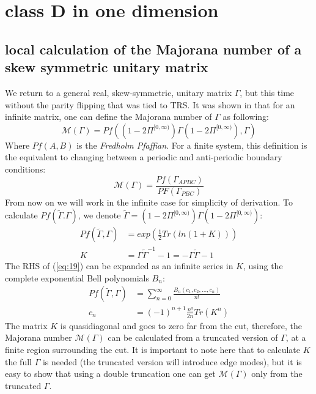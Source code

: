 \documentclass[%
 reprint,
 amsmath,amssymb,
 aps,
]{revtex4-2}
\begin{document}
\section{class D in one dimension}
\subsection{local calculation of the Majorana number of a skew symmetric unitary matrix}
We return to a general real, skew-symmetric, unitary matrix $\Gamma$, but this time without the parity flipping that was tied to TRS.
It was shown in \cite{kitaev2006} that for an infinite matrix, one can define the Majorana number of $\Gamma$ as following:
\begin{equation}
    \mathcal{M}(\Gamma)=Pf((1-2\Pi^{[0,\infty)})\Gamma(1-2\Pi^{[0,\infty)}),\Gamma)
\end{equation}
Where $Pf(A,B)$ is the \textit{Fredholm Pfaffian}. For a finite system, this definition is the equivalent to changing between a periodic and anti-periodic boundary conditions:
\begin{equation}
    \mathcal{M}(\Gamma)=\frac{Pf(\Gamma_{APBC})}{PF(\Gamma_{PBC})}
\end{equation}
From now on we will work in the infinite case for simplicity of derivation. To calculate $Pf(\tilde\Gamma. \Gamma)$, we denote $\tilde\Gamma=(1-2\Pi^{[0,\infty)})\Gamma(1-2\Pi^{[0,\infty)})$:
\begin{equation}
    \begin{split}
        Pf(\tilde\Gamma, \Gamma) &= exp \left( \frac{1}{2} Tr\left(ln(1 + K)\right) \right) \\
        K &= \Gamma\tilde\Gamma^{-1}-1=-\Gamma\tilde\Gamma-1
    \end{split} \label{eq:19}
\end{equation}
The RHS of (\ref{eq:19}) can be expanded as an infinite series in $K$, using the complete exponential Bell polynomials $B_n$:
\begin{equation}
    \begin{split}
        Pf(\tilde\Gamma, \Gamma) &= \sum_{n=0}^\infty \frac{B_n(c_1,c_2,...,c_n)}{n!} \\
        c_n&=(-1)^{n+1}\frac{n!}{2n}Tr(K^n)
    \end{split}
\end{equation}
The matrix $K$ is quasidiagonal and goes to zero far from the cut, therefore, the Majorana number $\mathcal{M}(\Gamma)$ can be calculated from a truncated version of $\Gamma$, at a finite region surrounding the cut. It is important to note here that to calculate $K$ the full $\Gamma$ is needed (the truncated version will introduce edge modes), but it is easy to show that using a double truncation one can get $\mathcal{M}(\Gamma)$ only from the truncated $\Gamma$.
\end{document}

